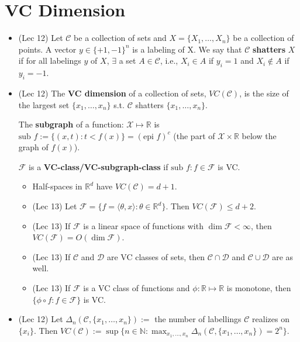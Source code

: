 \documentclass[twoside]{article}
\newcommand{\dis}{\displaystyle}
\newcommand\bbN{\mathbb{N}}
\newcommand\bbR{\mathbb{R}}
\newcommand\calC{\mathcal{C}}
\newcommand\calD{\mathcal{D}}
\newcommand\calF{\mathcal{F}}
\newcommand\Dlt{\Delta}
\def\t{\theta}
\begin{document}
\section{VC Dimension}
\begin{itemize}
\item (Lec 12) Let $\mathcal{C}$ be a collection of sets and $X = \{X_1,\dots, X_n\}$ be a collection of points. A vector $y \in \{+1, -1\}^n$ is a labeling of X. We say that $\mathcal{C}$ \textbf{shatters} $X$ if for all labelings $y$ of $X$, $\exists$  a set $A\in \mathcal{C}$, i.e., $X_i \in A$ if $y_i = 1$ and  $X_i  \not\in A$ if $y_i = -1$.

\item (Lec 12) The \textbf{VC dimension} of a collection of sets, $VC(\mathcal{C})$, is the size of the largest set $\{x_1,\dots, x_n\}$ s.t. $\mathcal{C}$ shatters $\{x_1,\dots, x_n\}$.

The \textbf{subgraph} of a function: $\mathcal{X} \mapsto \bbR$ is $\text{sub }f := \{(x,t):t<f(x)\}=(\text{epi }f)^c$ (the part of $\mathcal{X} \times \bbR$ below the graph of $f(x)$).

$\mathcal{F}$ is a \textbf{VC-class/VC-subgraph-class} if $\text{sub }f:f \in \calF$ is VC.

\begin{itemize}
\item Half-spaces in $\bbR^d$ have $VC(\mathcal{C}) = d+1$.

\item (Lec 13) Let $\calF = \{f = \langle \t, x \rangle: \t \in \bbR^d \}$. Then $VC(\calF) \leq d + 2$.

\item (Lec 13) If $\calF$ is a linear space of functions with $\dim \calF < \infty$, then $VC(\calF) = O(\dim \calF)$.

\item (Lec 13) If $\calC$ and $\calD$ are VC classes of sets, then $\calC \cap \calD$ and $\calC \cup \calD$ are as well.

\item (Lec 13) If $\calF$ is a VC class of functions and $\phi: \bbR \mapsto \bbR$ is monotone, then $\{ \phi \circ f: f \in \calF \}$ is VC.
\end{itemize}

\item (Lec 12) Let $\Dlt_n(\mathcal{C}, \{ x_1,\dots, x_n \}) := $ the number of labellings $\mathcal{C}$ realizes on $\{x_i\}$. Then $VC({\mathcal{C}}) := \dis\sup \{ n \in \bbN : \dis\max_{x_1,\ldots, x_n} \Delta_n(\mathcal{C},\{x_1, \dots, x_n\}) = 2^n\}$.


\end{itemize}
\end{document}
